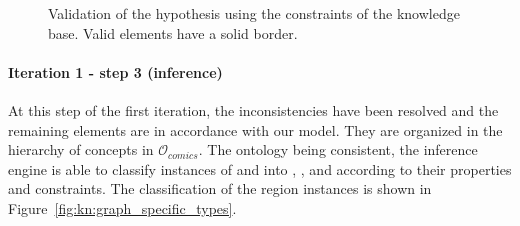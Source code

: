  \begin{figure}[!ht]  %
   \center
    \hspace{0.5em}
  \caption[Validation of the hypothesis using the constraints of the knowledge base]{Validation of the hypothesis using the constraints of the knowledge base. Valid elements have a solid border.}
  \label{fig:kn:graph_valid_initial}
 \end{figure}

\paragraph{Iteration 1 - step 3 (inference)} %
\label{par:step_3}

At this step of the first iteration, the inconsistencies have been resolved and the remaining elements are in accordance with our model.
They are organized in the hierarchy of concepts in $\mathcal{O}_{comics}$.
The ontology being consistent, the inference engine is able to classify instances of   and  into , ,  and  according to their properties and constraints.
The classification of the region instances is shown in Figure~\ref{fig:kn:graph_specific_types}.

